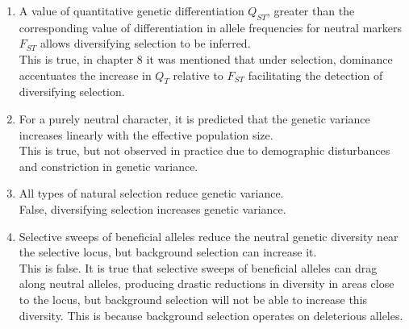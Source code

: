 \documentclass[12pt]{amsart}
\begin{document}
\begin{enumerate}
\item A value of quantitative genetic differentiation $Q_{ST}$, greater than the corresponding value of differentiation in allele frequencies for neutral markers $F_{ST}$ allows diversifying selection to be inferred.\\
This is true, in chapter 8 it was mentioned that under selection, dominance accentuates the increase in $Q_T$ relative to $F_{ST}$ facilitating the detection of diversifying selection.\\
\item For a purely neutral character, it is predicted that the genetic variance increases linearly with the effective population size.\\
This is true, but not observed in practice due to demographic disturbances and constriction in genetic variance. \\
\item All types of natural selection reduce genetic variance.\\
False, diversifying selection increases genetic variance.\\
\item Selective sweeps of beneficial alleles reduce the neutral genetic diversity near the selective locus, but background selection can increase it.\\
This is false. It is true that selective sweeps of beneficial alleles can drag along neutral alleles, producing drastic reductions in diversity in areas close to the locus, but background selection will not be able to increase this diversity. This is because background selection operates on deleterious alleles.\\
\medskip
\end{enumerate}
\end{document}
